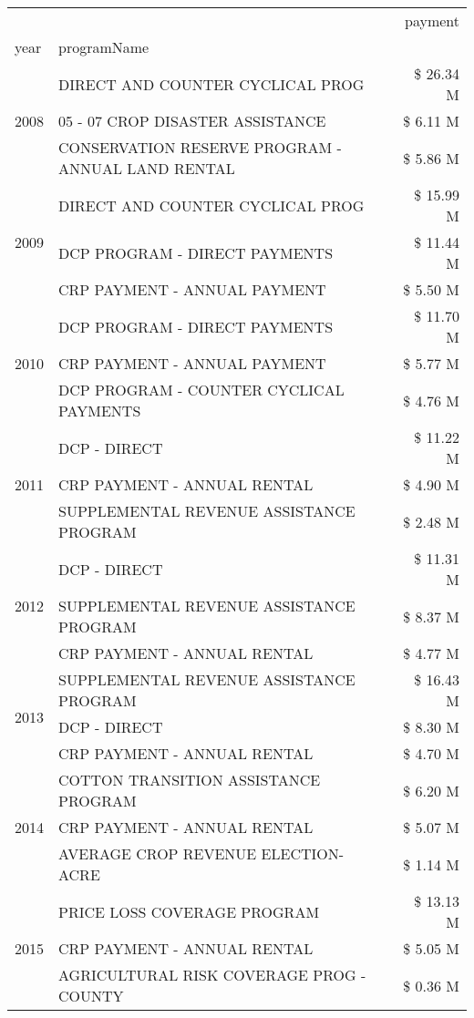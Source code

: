 \begin{tabular}{llr}
\toprule
 &  & payment \\
year & programName &  \\
\midrule
\multirow[t]{3}{*}{2008} & DIRECT AND COUNTER CYCLICAL PROG & \$ 26.34 M \\
 & 05 - 07 CROP DISASTER ASSISTANCE & \$ 6.11 M \\
 & CONSERVATION RESERVE PROGRAM - ANNUAL LAND RENTAL & \$ 5.86 M \\
\cline{1-3}
\multirow[t]{3}{*}{2009} & DIRECT AND COUNTER CYCLICAL PROG & \$ 15.99 M \\
 & DCP PROGRAM - DIRECT PAYMENTS & \$ 11.44 M \\
 & CRP PAYMENT - ANNUAL PAYMENT & \$ 5.50 M \\
\cline{1-3}
\multirow[t]{3}{*}{2010} & DCP PROGRAM - DIRECT PAYMENTS & \$ 11.70 M \\
 & CRP PAYMENT - ANNUAL PAYMENT & \$ 5.77 M \\
 & DCP PROGRAM - COUNTER CYCLICAL PAYMENTS & \$ 4.76 M \\
\cline{1-3}
\multirow[t]{3}{*}{2011} & DCP - DIRECT & \$ 11.22 M \\
 & CRP PAYMENT - ANNUAL RENTAL & \$ 4.90 M \\
 & SUPPLEMENTAL REVENUE ASSISTANCE PROGRAM & \$ 2.48 M \\
\cline{1-3}
\multirow[t]{3}{*}{2012} & DCP - DIRECT & \$ 11.31 M \\
 & SUPPLEMENTAL REVENUE ASSISTANCE PROGRAM & \$ 8.37 M \\
 & CRP PAYMENT - ANNUAL RENTAL & \$ 4.77 M \\
\cline{1-3}
\multirow[t]{3}{*}{2013} & SUPPLEMENTAL REVENUE ASSISTANCE PROGRAM & \$ 16.43 M \\
 & DCP - DIRECT & \$ 8.30 M \\
 & CRP PAYMENT - ANNUAL RENTAL & \$ 4.70 M \\
\cline{1-3}
\multirow[t]{3}{*}{2014} & COTTON TRANSITION ASSISTANCE PROGRAM & \$ 6.20 M \\
 & CRP PAYMENT - ANNUAL RENTAL & \$ 5.07 M \\
 & AVERAGE CROP REVENUE ELECTION-ACRE & \$ 1.14 M \\
\cline{1-3}
\multirow[t]{3}{*}{2015} & PRICE LOSS COVERAGE PROGRAM & \$ 13.13 M \\
 & CRP PAYMENT - ANNUAL RENTAL & \$ 5.05 M \\
 & AGRICULTURAL RISK COVERAGE PROG - COUNTY & \$ 0.36 M \\

\end{tabular}
